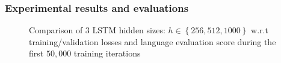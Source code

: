 \begin{itemize}
\subsubsection{Experimental results and evaluations}
\begin{figure}[ht]
	\caption[Comparison of $3$ LSTM hidden sizes]{Comparison of $3$ LSTM hidden sizes: $h \in \left\{ 256, 512, 1000 \right\}$ w.r.t training/validation losses and language evaluation score during the first $50,000$ training iterations}
	\label{fig:exp2} %
\end{figure}


\end{itemize}
